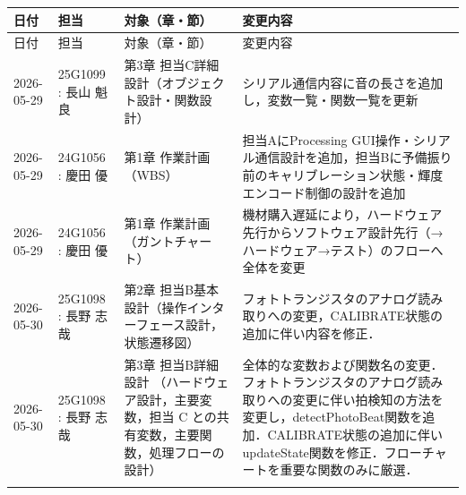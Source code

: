 %
%
%

\begin{longtable}{p{2.2cm}p{3.5cm}p{4cm}p{5.5cm}}
\toprule
日付 & 担当 & 対象（章・節） & 変更内容 \\
\midrule
\endfirsthead

\toprule
日付 & 担当 & 対象（章・節） & 変更内容 \\
\midrule
\endhead

2026-05-29 & 25G1099 : 長山 魁良 & 第3章 担当C詳細設計（オブジェクト設計・関数設計） & シリアル通信内容に音の長さを追加し，変数一覧・関数一覧を更新 \\
2026-05-29 & 24G1056 : 慶田 優 & 第1章 作業計画（WBS） & 担当AにProcessing GUI操作・シリアル通信設計を追加，担当Bに予備振り前のキャリブレーション状態・輝度エンコード制御の設計を追加 \\
2026-05-29 & 24G1056 : 慶田 優 & 第1章 作業計画（ガントチャート） & 機材購入遅延により，ハードウェア先行からソフトウェア設計先行（→ハードウェア→テスト）のフローへ全体を変更 \\
2026-05-30 & 25G1098 : 長野 志哉 & 第2章 担当B基本設計（操作インターフェース設計，状態遷移図） & フォトトランジスタのアナログ読み取りへの変更，CALIBRATE状態の追加に伴い内容を修正． \\
2026-05-30 & 25G1098 : 長野 志哉 & 第3章 担当B詳細設計 （ハードウェア設計，主要変数，担当 C との共有変数，主要関数，処理フローの設計）& 全体的な変数および関数名の変更．フォトトランジスタのアナログ読み取りへの変更に伴い拍検知の方法を変更し，detectPhotoBeat関数を追加．CALIBRATE状態の追加に伴いupdateState関数を修正．フローチャートを重要な関数のみに厳選． \\

\bottomrule
\endfoot
\end{longtable}
